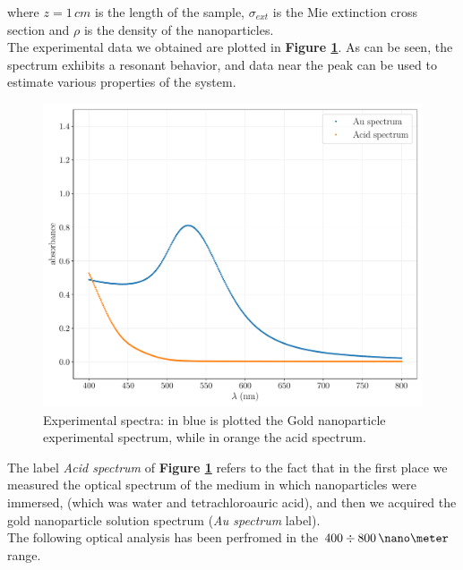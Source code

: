 \documentclass[twocolumn]{article}
\begin{document}
\begin{multicols}{2}
\noindent
where $z=1\, cm$ is the length of the sample, $\sigma_{ext}$ is the Mie extinction cross section and $\rho$ is the density of the nanoparticles. \\

The experimental data we obtained are plotted in \textbf{Figure \ref{fig:exp_data}}. As can be seen, the spectrum exhibits a resonant behavior, and data near the peak can be used to estimate various properties of the system. \\

\begin{figure}[H]
    \centering
    \includegraphics[width=\linewidth]{image/data/exp_data.pdf}
    \caption{Experimental spectra: in blue is plotted the Gold nanoparticle experimental spectrum, while in orange the acid spectrum.}
    \label{fig:exp_data}
\end{figure}

The label \textit{Acid spectrum} of \textbf{Figure \ref{fig:exp_data}} refers to the fact that in the first place we measured the optical spectrum of the medium in which nanoparticles were immersed, (which was water and tetrachloroauric acid),  and then we acquired the gold
nanoparticle solution spectrum (\textit{Au spectrum} label). \\

The following optical analysis has been perfromed in the $400 \div 800\,\nano\meter$ range.



\end{multicols}
\end{document}
